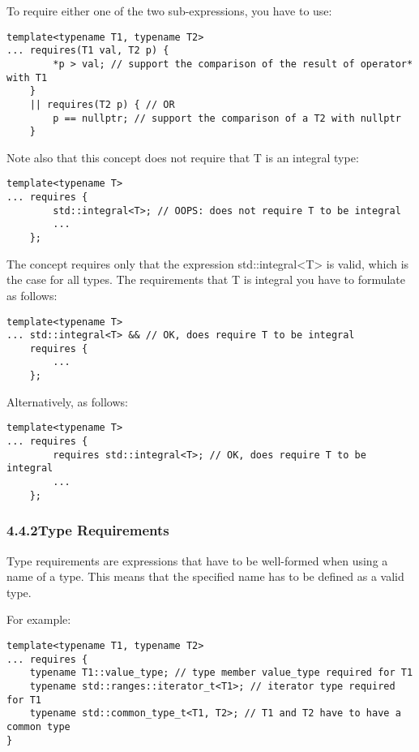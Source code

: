 To require either one of the two sub-expressions, you have to use:

\begin{lstlisting}[style=styleCXX]
template<typename T1, typename T2>
... requires(T1 val, T2 p) {
		*p > val; // support the comparison of the result of operator* with T1
	}
	|| requires(T2 p) { // OR
		p == nullptr; // support the comparison of a T2 with nullptr
	}
\end{lstlisting}

Note also that this concept does not require that T is an integral type:

\begin{lstlisting}[style=styleCXX]
template<typename T>
... requires {
		std::integral<T>; // OOPS: does not require T to be integral
		...
	};
\end{lstlisting}

The concept requires only that the expression std::integral<T> is valid, which is the case for all types. The requirements that T is integral you have to formulate as follows:

\begin{lstlisting}[style=styleCXX]
template<typename T>
... std::integral<T> && // OK, does require T to be integral
	requires {
		...
	};
\end{lstlisting}

Alternatively, as follows:

\begin{lstlisting}[style=styleCXX]
template<typename T>
... requires {
		requires std::integral<T>; // OK, does require T to be integral
		...
	};
\end{lstlisting}

\subsubsection*{ 4.4.2\hspace{0.2cm}Type Requirements}

Type requirements are expressions that have to be well-formed when using a name of a type. This means that the specified name has to be defined as a valid type.

For example:

\begin{lstlisting}[style=styleCXX]
template<typename T1, typename T2>
... requires {
	typename T1::value_type; // type member value_type required for T1
	typename std::ranges::iterator_t<T1>; // iterator type required for T1
	typename std::common_type_t<T1, T2>; // T1 and T2 have to have a common type
}
\end{lstlisting}

